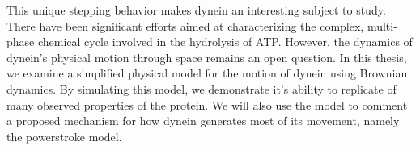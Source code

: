 This unique stepping behavior makes dynein an interesting subject to study. There have been significant efforts aimed at characterizing the complex, multi-phase chemical cycle involved in the hydrolysis of ATP\cite{cianfrocco_mechanism_2015}. However, the dynamics of dynein's physical motion through space remains an open question. In this thesis, we examine a simplified physical model for the motion of dynein using Brownian dynamics. By simulating this model, we demonstrate it's ability to replicate of many observed properties of the protein. We will also use the model to comment a proposed mechanism for how dynein generates most of its movement, namely the powerstroke model. 

